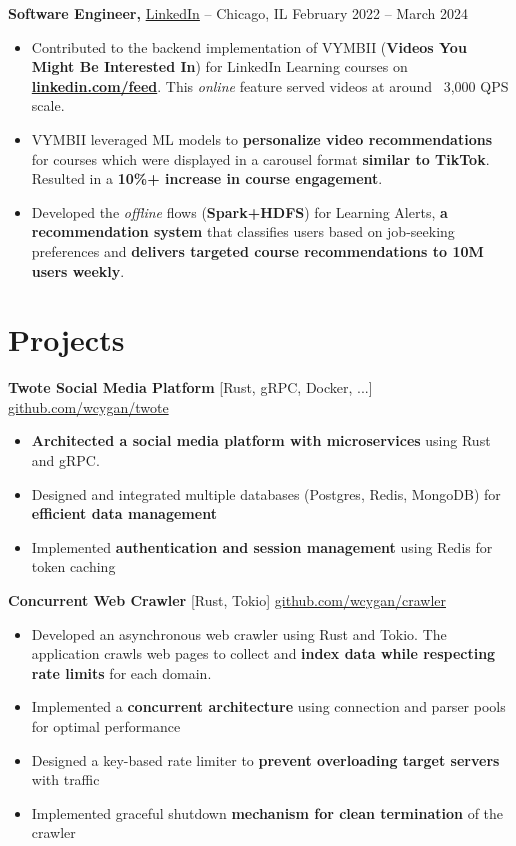 \documentclass[11pt]{article}
\begin{document}
\textbf{Software Engineer,} \href{https://www.linkedin.com/}{LinkedIn} -- Chicago, IL \hfill February 2022 -- March 2024 \\
\vspace{-9pt}
\begin{itemize}
  \item Contributed to the backend implementation of VYMBII (\textbf{Videos You Might Be Interested In}) for LinkedIn Learning courses on \textbf{\href{https://linkedin.com/feed}{linkedin.com/feed}}. This \textit{online} feature served videos at around ~3,000 QPS scale.
  \item VYMBII leveraged ML models to \textbf{personalize video recommendations} for courses which were displayed in a carousel format \textbf{similar to TikTok}. Resulted in a \textbf{10\%+ increase in course engagement}.
  \item Developed the \textit{offline} flows (\textbf{Spark+HDFS}) for Learning Alerts, \textbf{a recommendation system} that classifies users based on job-seeking preferences and \textbf{delivers targeted course recommendations to 10M users weekly}. 
\end{itemize}

\vspace{-18.5pt}

\section*{Projects}
\textbf{Twote Social Media Platform} [Rust, gRPC, Docker, ...] \hfill \href{https://github.com/wcygan/twote}{github.com/wcygan/twote} \\
\vspace{-9pt}
\begin{itemize}
  \item \textbf{Architected a social media platform with microservices} using Rust and gRPC.
  \item Designed and integrated multiple databases {(Postgres, Redis, MongoDB) for \textbf{efficient data management}}
  \item Implemented \textbf{authentication and session management} using Redis for token caching
\end{itemize}

\textbf{Concurrent Web Crawler} [Rust, Tokio] \hfill \href{https://github.com/wcygan/crawler}{github.com/wcygan/crawler} \\
\vspace{-9pt}
\begin{itemize}

  \item Developed an asynchronous web crawler using Rust and Tokio. The application crawls web pages to collect and \textbf{index data while respecting rate limits} for each domain.
  \item Implemented a \textbf{concurrent architecture} using connection and parser pools for optimal performance
  \item Designed a key-based rate limiter to \textbf{prevent overloading target servers} with traffic
  \item Implemented graceful shutdown \textbf{mechanism for clean termination} of the crawler
\end{itemize}
\end{document}

